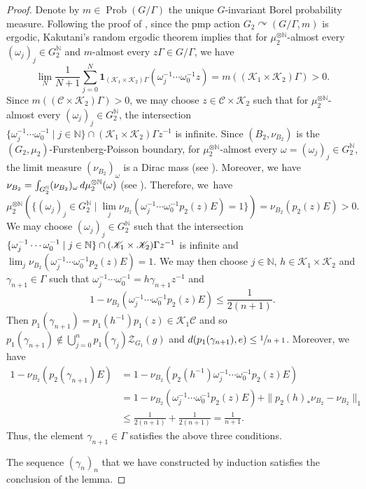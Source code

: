 \documentclass[11pt]{article}
\theoremstyle{definition}
\newcommand{\N}{\mathbb{N}}
\DeclareMathOperator{\Prob}{Prob}
\begin{document}
\begin{proof}
Denote by $m \in \Prob(G/\Gamma)$ the unique $G$-invariant Borel probability measure. Following the proof of \cite[Lem.\,5.1]{Pe14}, since the pmp action $G_2 \curvearrowright (G/\Gamma, m)$ is ergodic, Kakutani's random ergodic theorem implies that for $\mu_2^{\otimes \N}$-almost every $(\omega_j)_j \in G_2^{\N}$ and $m$-almost every $z\Gamma \in G/\Gamma$, we have
\[
\lim_N \frac{1}{N + 1} \sum_{j = 0}^N \mathbf 1_{(\mathscr K_1 \times \mathscr K_2)\Gamma}(\omega_j^{-1} \cdots \omega_0^{-1} z) = m((\mathscr K_1 \times \mathscr K_2)\Gamma) > 0.
\]
Since $m((\mathscr C \times \mathscr K_2)\Gamma) > 0$, we may choose $z \in \mathscr C \times \mathscr K_2$ such that for $\mu_2^{\otimes \N}$-almost every $(\omega_j)_j \in G_2^{\N}$, the intersection $\{ \omega_j^{-1} \cdots \omega_0^{-1} \mid j \in \N \} \cap (\mathscr K_1 \times \mathscr K_2)\Gamma z^{-1}$ is infinite. Since $(B_2, \nu_{B_2})$ is the $(G_2, \mu_2)$-Furstenberg-Poisson boundary, for $\mu_2^{\otimes \N}$-almost every $\omega = (\omega_j)_j \in G_2^\N$, the limit measure $(\nu_{B_2})_\omega$ is a Dirac mass (see \cite[Th.\,2.14]{BS04}). Moreover, we have $\nu_{B_2} = \int_{G_2^\N} (\nu_{B_2})_\omega\, {\rm d}\mu_2^{\otimes \N}(\omega)$ (see \cite[Th.\,2.10]{BS04}). Therefore, we~have
\[
\mu_2^{\otimes \N} (\{(\omega_j)_j \in G_2^\N \mid \lim_j \nu_{B_2}(\omega_j^{-1} \cdots \omega_0^{-1} p_2(z) E) = 1\}) = \nu_{B_2}(p_2(z) E) > 0.
\]
We may choose $(\omega_j)_j \in G_2^{\N}$ such that the intersection $\{ \omega_j^{-1} \cdots \omega_0^{-1} \mid j \in \N \} \cap (\mathscr K_1 \times\nobreak \mathscr K_2)\Gamma z^{-1}$ is infinite and $\lim_j \nu_{B_2}(\omega_j^{-1} \cdots \omega_0^{-1} p_2(z) E) = 1$. We may then choose $j \in \N$, $h \in \mathscr K_1 \times \mathscr K_2$ and $\gamma_{n + 1} \in \Gamma$ such that $\omega_j^{-1} \cdots \omega_0^{-1} = h \gamma_{n + 1} z^{-1}$ and
\[
1 - \nu_{B_2}(\omega_j^{-1} \cdots \omega_0^{-1} p_2(z) E) \leq \frac{1}{2(n + 1)}.
\]
Then $p_1(\gamma_{n + 1}) = p_1(h^{-1})p_1(z) \in \mathscr K_1 \mathscr C$ and so $p_1(\gamma_{n + 1}) \notin \bigcup_{j = 0}^n p_1(\gamma_j)\mathscr Z_{G_1}(g)$ and $d(p_1(\gamma_{n + 1}), e) \leq \sfrac{1}{n + 1}$. Moreover, we have
\begin{align*}
1 - \nu_{B_2}(p_2(\gamma_{n + 1}) E) &= 1 - \nu_{B_2}(p_2(h^{-1}) \omega_j^{-1} \cdots \omega_0^{-1} p_2(z) E) \\
&= 1 - \nu_{B_2}(\omega_j^{-1} \cdots \omega_0^{-1} p_2(z) E) + \|p_2(h)_\ast \nu_{B_2} - \nu_{B_2}\|_1 \\
&\leq \frac{1}{2(n + 1)} + \frac{1}{2(n + 1)} = \frac{1}{n + 1}.
\end{align*}
Thus, the element $\gamma_{n + 1} \in \Gamma$ satisfies the above three conditions.

The sequence $(\gamma_n)_n$ that we have constructed by induction satisfies the conclusion of the lemma.
\end{proof}
\end{document}

